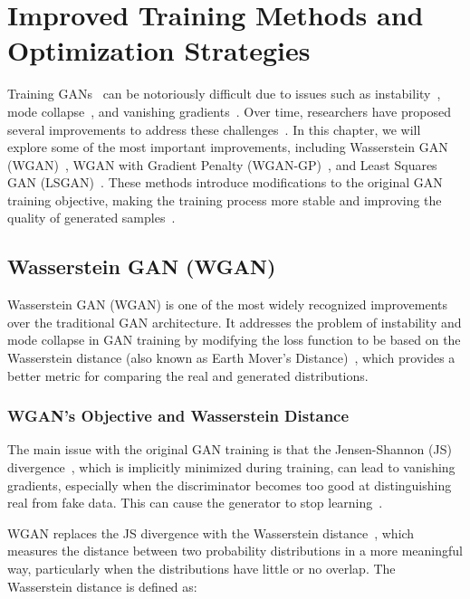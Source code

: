 \chapter{Improved Training Methods and Optimization Strategies}
Training GANs~\cite{mescheder2018training} can be notoriously difficult due to issues such as instability~\cite{becker2022instability}, mode collapse~\cite{durall2020combating}, and vanishing gradients~\cite{ding2022take}. Over time, researchers have proposed several improvements to address these challenges~\cite{kossale2022mode}. In this chapter, we will explore some of the most important improvements, including Wasserstein GAN (WGAN)~\cite{adler2018banach}, WGAN with Gradient Penalty (WGAN-GP)~\cite{gulrajani2017improved}, and Least Squares GAN (LSGAN)~\cite{mao2017least}. These methods introduce modifications to the original GAN training objective, making the training process more stable and improving the quality of generated samples~\cite{kossale2022mode}.

\section{Wasserstein GAN (WGAN)}
Wasserstein GAN (WGAN) is one of the most widely recognized improvements over the traditional GAN architecture. It addresses the problem of instability and mode collapse in GAN training by modifying the loss function to be based on the Wasserstein distance (also known as Earth Mover's Distance)~\cite{adler2018banach}, which provides a better metric for comparing the real and generated distributions.

\subsection{WGAN's Objective and Wasserstein Distance}
The main issue with the original GAN training is that the Jensen-Shannon (JS) divergence~\cite{fuglede2004jensen}, which is implicitly minimized during training, can lead to vanishing gradients, especially when the discriminator becomes too good at distinguishing real from fake data. This can cause the generator to stop learning~\cite{adler2018banach}.

WGAN replaces the JS divergence with the Wasserstein distance~\cite{adler2018banach}, which measures the distance between two probability distributions in a more meaningful way, particularly when the distributions have little or no overlap. The Wasserstein distance is defined as:

